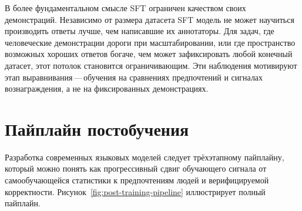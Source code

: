 В более фундаментальном смысле SFT ограничен качеством своих демонстраций. Независимо от размера датасета SFT модель не может научиться производить ответы лучше, чем написавшие их аннотаторы. Для задач, где человеческие демонстрации дороги при масштабировании, или где пространство возможных хороших ответов богаче, чем может зафиксировать любой конечный датасет, этот потолок становится ограничивающим. Эти наблюдения мотивируют этап выравнивания\,---\,обучения на сравнениях предпочтений и сигналах вознаграждения, а не на фиксированных демонстрациях.

\section{Пайплайн постобучения}
\label{sec:post-training-pipeline}

Разработка современных языковых моделей следует трёхэтапному пайплайну, который можно понять как прогрессивный сдвиг обучающего сигнала от самообучающейся статистики к предпочтениям людей и верифицируемой корректности. Рисунок~\ref{fig:post-training-pipeline} иллюстрирует полный пайплайн.

